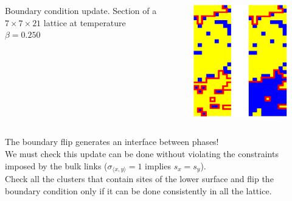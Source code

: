 \documentclass[12pt,handout]{beamer}
\begin{document}
\begin{frame}
\begin{center}
\begin{columns}
\begin{column}{0.20\textwidth}
\begin{center}
Boundary condition update.
Section of a $7 \times 7 \times 21$ lattice at temperature $\beta = 0.250$
\end{center}
\end{column}
\begin{column}{0.80\textwidth}
\begin{figure}[!htb]
\centering
\includegraphics[scale=0.5]{boundaryFlip.png}
\end{figure}

\end{column}
\end{columns}

\end{center}
\end{frame}

\begin{frame}
\begin{center}
{ \large The boundary flip generates an interface between phases!\\ } 
\vspace{20pt}
We must check this update can be done without violating the constraints imposed by the bulk links ($\sigma_{\langle x, y \rangle} = 1$ implies $s_x = s_y$).\\
\vspace{20pt}
Check all the clusters that contain sites of the lower surface and flip the boundary condition only if it can be done consistently in all the lattice.
\end{center}
\end{frame}
\end{document}
